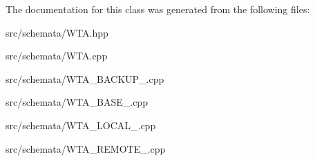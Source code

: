 The documentation for this class was generated from the following files\+:\begin{DoxyCompactItemize}
\item 
src/schemata/W\+T\+A.\+hpp\item 
src/schemata/W\+T\+A.\+cpp\item 
src/schemata/W\+T\+A\+\_\+\+B\+A\+C\+K\+U\+P\+\_.\+cpp\item 
src/schemata/W\+T\+A\+\_\+\+B\+A\+S\+E\+\_.\+cpp\item 
src/schemata/W\+T\+A\+\_\+\+L\+O\+C\+A\+L\+\_.\+cpp\item 
src/schemata/W\+T\+A\+\_\+\+R\+E\+M\+O\+T\+E\+\_.\+cpp\end{DoxyCompactItemize}
